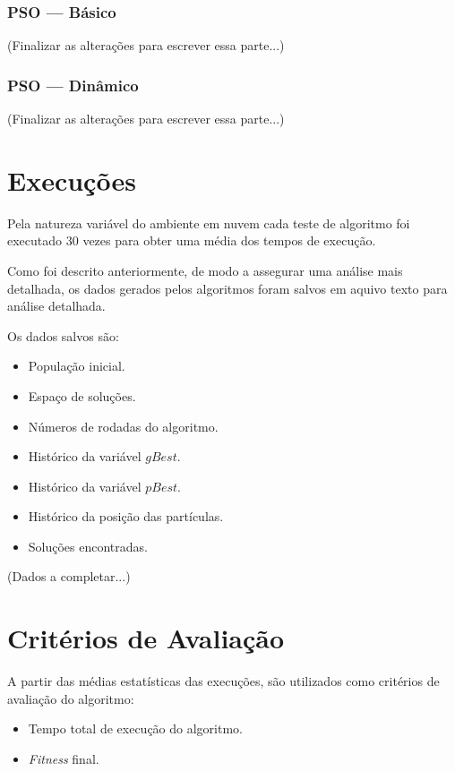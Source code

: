         \subsubsection{PSO — Básico}
            (Finalizar as alterações para escrever essa parte...)

        \subsubsection{PSO — Dinâmico}
            (Finalizar as alterações para escrever essa parte...)

    



\section{Execuções}
    Pela natureza variável do ambiente em nuvem cada teste de algoritmo foi executado 30 vezes para obter uma média dos tempos de execução.\newline
    
    Como foi descrito anteriormente, de modo a assegurar uma análise mais detalhada, os dados gerados pelos algoritmos foram salvos em aquivo texto para análise detalhada.\newline
    
    Os dados salvos são:
    \begin{itemize}
        \item População inicial.
        \item Espaço de soluções.
        \item Números de rodadas do algoritmo.
        \item Histórico da variável $gBest$.
        \item Histórico da variável $pBest$.
        \item Histórico da posição das partículas.
        \item Soluções encontradas.
    \end{itemize}
    
    (Dados a completar...)


\section{Critérios de Avaliação}
    A partir das médias estatísticas das execuções, são utilizados como critérios de avaliação do algoritmo: \hfill
    \begin{itemize}
        \item Tempo total de execução do algoritmo.
        \item \textit{Fitness} final.
    \end{itemize}
    
